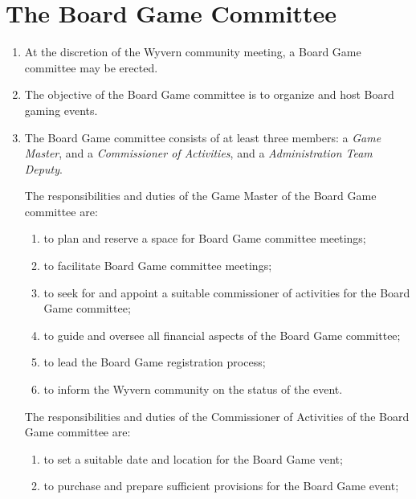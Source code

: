 \section{The Board Game Committee}

\begin{enumerate}
    \item At the discretion of the Wyvern community meeting, a Board Game committee may be erected.

    \item The objective of the Board Game committee is to organize and host Board gaming events.
    
    \item The Board Game committee consists of at least three members: a \textit{Game Master}, and a \textit{Commissioner of Activities}, and a \textit{Administration Team Deputy}.

    \begin{item}
        The responsibilities and duties of the Game Master of the Board Game committee are:
        \begin{enumerate}
            \item to plan and reserve a space for Board Game committee meetings;
            \item to facilitate Board Game committee meetings;
            \item to seek for and appoint a suitable commissioner of activities for the Board Game committee;
            \item to guide and oversee all financial aspects of the Board Game committee;
            \item to lead the Board Game registration process;
            \item to inform the Wyvern community on the status of the event.
        \end{enumerate}
    \end{item}
    
    \begin{item}
        The responsibilities and duties of the Commissioner of Activities of the Board Game committee are:
        \begin{enumerate}
            \item to set a suitable date and location for the Board Game vent;
            \item to purchase and prepare sufficient provisions for the Board Game event;
        \end{enumerate}
    \end{item}


\end{enumerate}
